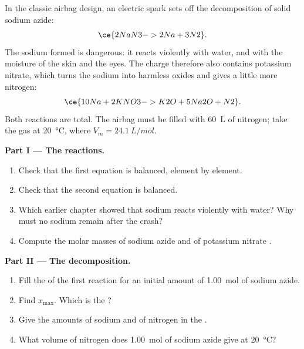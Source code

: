 \begin{problem}
\label{pb:g10:reaction-progress-table:1}
In the classic airbag design, an electric spark sets off the
decomposition of solid sodium azide:
\[
  \ce{2NaN3 -> 2Na + 3N2} .
\]
The sodium  formed is dangerous: it reacts violently with water,
and with the moisture of the skin and the eyes. The charge therefore
also contains potassium nitrate, which turns the sodium into harmless
oxides and gives a little more nitrogen:
\[
  \ce{10Na + 2KNO3 -> K2O + 5Na2O + N2} .
\]
Both reactions are total. The airbag must be filled with \qty{60}{L} of
nitrogen; take the gas at \qty{20}{\celsius}, where
$V_m = \qty{24.1}{L/mol}$.

\medskip
\noindent\textbf{Part I --- The reactions.}
\begin{enumerate}
  \item Check that the first equation is balanced, element by element.
  \item Check that the second equation is balanced.
  \item Which earlier chapter showed that sodium reacts violently with
        water? Why must no sodium remain after the crash?
  \item Compute the molar masses of sodium azide  and of
        potassium nitrate .
\end{enumerate}

\medskip
\noindent\textbf{Part II --- The decomposition.}
\begin{enumerate}[resume]
  \item Fill the  of the first reaction for an initial
        amount of \qty{1.00}{mol} of sodium azide.
  \item Find $x_{\max}$. Which is the ?
  \item Give the amounts of sodium and of nitrogen in the .
  \item What volume of nitrogen does \qty{1.00}{mol} of sodium azide give
        at \qty{20}{\celsius}?
\end{enumerate}


\end{problem}
